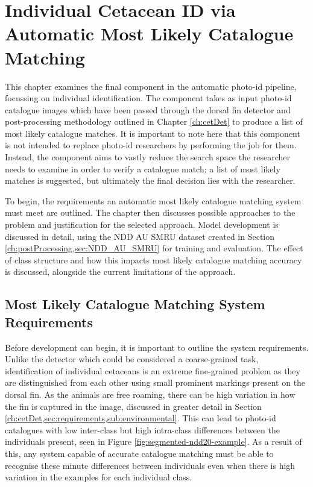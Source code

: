 \chapter{Individual Cetacean ID via Automatic Most Likely Catalogue Matching}\label{ch:ID}

This chapter examines the final component in the automatic photo-id pipeline, focussing on individual identification. The component takes as input photo-id catalogue images which have been passed through the dorsal fin detector and post-processing methodology outlined in Chapter \ref{ch:cetDet} to produce a list of most likely catalogue matches. It is important to note here that this component is not intended to replace photo-id researchers by performing the job for them. Instead, the component aims to vastly reduce the search space the researcher needs to examine in order to verify a catalogue match; a list of most likely matches is suggested, but ultimately the final decision lies with the researcher.

To begin, the requirements an automatic most likely catalogue matching system must meet are outlined. The chapter then discusses possible approaches to the problem and justification for the selected approach. Model development is discussed in detail, using the NDD AU SMRU dataset created in Section \ref{ch:postProcessing,sec:NDD_AU_SMRU} for training and evaluation. The effect of class structure and how this impacts most likely catalogue matching accuracy is discussed, alongside the current limitations of the approach. 

\section{Most Likely Catalogue Matching System Requirements}\label{ch:ID,sec:Requirements}

Before development can begin, it is important to outline the system requirements. Unlike the detector which could be considered a coarse-grained task, identification of individual cetaceans is an extreme fine-grained problem as they are distinguished from each other using small prominent markings present on the dorsal fin. As the animals are free roaming, there can be high variation in how the fin is captured in the image, discussed in greater detail in Section \ref{ch:cetDet,sec:requirements,sub:environmental}. This can lead to photo-id catalogues with low inter-class but high intra-class differences between the individuals present, seen in Figure \ref{fig:segmented-ndd20-example}. As a result of this, any system capable of accurate catalogue matching must be able to recognise these minute differences between individuals even when there is high variation in the examples for each individual class. 

